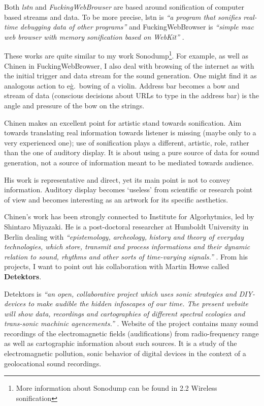 \documentclass[12pt,a4paper,oneside]{report}
\begin{document}
Both \emph{lstn} and \emph{FuckingWebBrowser} are based around sonification of computer based streams and data. To be more precise, lstn is \emph{``a program that sonifies real-time debugging data of other programs''} and FuckingWebBrowser is \emph{``simple mac web browser with memory sonification based on WebKit''} \cite{Chinen2010, Chinen2010a}.

These works are quite similar to my work Sonodump\footnote{More information about Sonodump can be found in 2.2 Wireless sonification}. For example, as well as Chinen in FuckingWebBrowser, I also deal with browsing of the internet as with the initial trigger and data stream for the sound generation. One might find it as analogous action to e\.g.\, bowing of a violin. Address bar becomes a bow and stream of data (conscious decisions about URLs to type in the address bar) is the angle and pressure of the bow on the strings. 

Chinen makes an excellent point for artistic stand towards sonification. Aim towards translating real information towards listener is missing (maybe only to a very experienced one); use of sonification plays a different, artistic, role, rather than the one of auditory display. It is about using a pure source of data for sound generation, not a source of information meant to be mediated towards audience.

His work is representative and direct, yet its main point is not to convey information. Auditory display becomes `useless' from scientific or research point of view and becomes interesting as an artwork for its specific aesthetics.

Chinen's work has been strongly connected to Institute for Algorhytmics, led by Shintaro Miyazaki. He is a post-doctoral researcher at Humboldt University in Berlin dealing with \emph{``epistemology, archeology, history and theory of everyday technologies, which store, transmit and process informations and their dynamic relation to sound, rhythms and other sorts of time-varying signals.''} \cite{Miyazaki2012}. From his projects, I want to point out his collaboration with Martin Howse \cite{howse} called \textbf{Detektors}.

Detektors is \emph{``an open, collaborative project which uses sonic strategies and DIY-devices to make audible the hidden infoscapes of our time. The present website will show data, recordings and cartographies of different spectral ecologies and trans-sonic machinic agencements.''} \cite{detektors}. Website of the project contains many sound recordings of the electromagnetic fields (audifications) from radio-frequency range as well as cartographic information about such sources. It is a study of the electromagnetic pollution, sonic behavior of digital devices in the context of a geolocational sound recordings.
\end{document}

